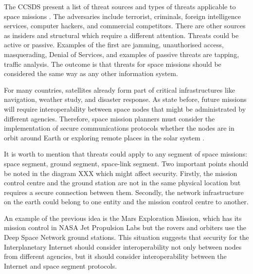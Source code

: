 The CCSDS present a list of threat sources and types of threats applicable to space missions \cite{book2006security}. The adversaries include terrorist, criminals, foreign intelligence services, computer hackers, and commercial competitors. There are other sources as insiders and structural which require a different attention. Threats could be active or passive. Examples of the first are jamming, unauthorised access, masquerading, Denial of Services, and examples of passive threats are tapping, traffic analysis. The outcome is that threats for space missions should be considered the same way as any other information system.


For many countries, satellites already form part of critical infrastructures like navigation, weather study, and disaster response.  As state before, future missions will require interoperability between space nodes that might be administrated by different agencies. Therefore, space mission planners must consider the implementation of secure communications protocols whether the nodes are in orbit around Earth or exploring remote places in the solar system  \cite{book2006security}.


It is worth to mention that threats could apply to any segment of space missions: space segment, ground segment, space-link segment. Two important points should be noted in the diagram XXX which might affect security.  Firstly, the mission control centre and the ground station are not in the same physical location but requires a secure connection between them. Secondly, the network infrastructure on the earth could belong to one entity and the mission control centre to another.  

An example of the previous idea is the Mars Exploration Mission, which has its mission control in NASA Jet Propulsion Labs but the rovers and orbiters use the Deep Space Network ground stations. This situation suggests that security for the Interplanetary Internet should consider interoperability not only between nodes from different agencies, but it should consider interoperability between the Internet and space segment protocols. 

 
